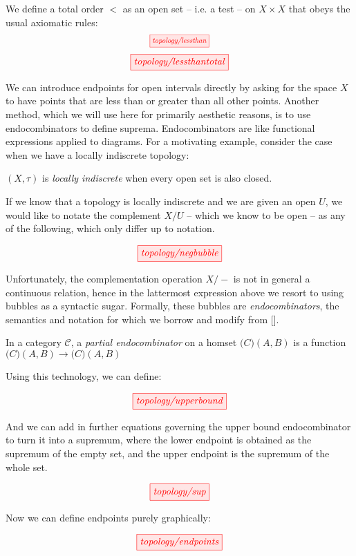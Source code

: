 \begin{fullwidth}
 We define a total order $<$ as an open set -- i.e. a test -- on $X \times X$ that obeys the usual axiomatic rules:
\[\scalebox{0.75}{\tikzfig{topology/lessthan}}\]
\[\tikzfig{topology/lessthantotal}\]

 We can introduce endpoints for open intervals directly by asking for the space $X$ to have points that are less than or greater than all other points. Another method, which we will use here for primarily aesthetic reasons, is to use endocombinators to define suprema. Endocombinators are like functional expressions applied to diagrams. For a motivating example, consider the case when we have a locally indiscrete topology:

\begin{defn}
$(X,\tau)$ is \emph{locally indiscrete} when every open set is also closed.
\end{defn}

If we know that a topology is locally indiscrete and we are given an open $U$, we would like to notate the complement $X/U$ -- which we know to be open -- as any of the following, which only differ up to notation.

\[\tikzfig{topology/negbubble}\]

Unfortunately, the complementation operation $X/-$ is not in general a continuous relation, hence in the lattermost expression above we resort to using bubbles as a syntactic sugar. Formally, these bubbles are \emph{endocombinators}, the semantics and notation for which we borrow and modify from [].

\begin{defn}
In a category $\mathcal{C}$, a \emph{partial endocombinator} on a homset $\mathcal(C)(A,B)$ is a function $\mathcal(C)(A,B) \rightarrow \mathcal(C)(A,B)$
\end{defn}

Using this technology, we can define:

\[\tikzfig{topology/upperbound}\]

And we can add in further equations governing the upper bound endocombinator to turn it into a supremum, where the lower endpoint is obtained as the supremum of the empty set, and the upper endpoint is the supremum of the whole set.

\[\tikzfig{topology/sup}\]

Now we can define endpoints purely graphically:

\[\tikzfig{topology/endpoints}\]


\end{fullwidth}
